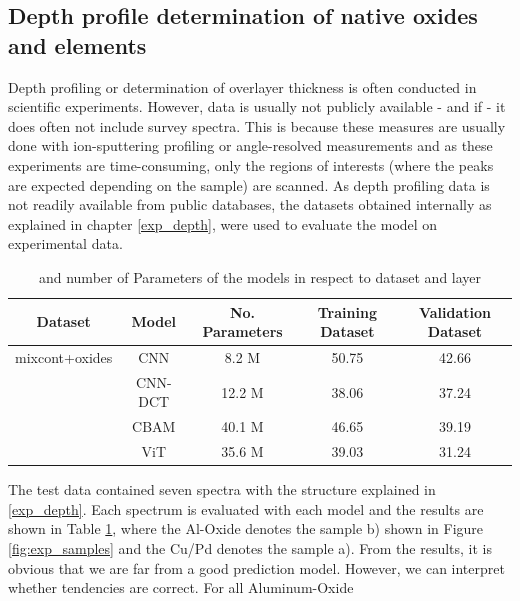 \subsection{Depth profile determination of native oxides and elements}

Depth profiling or determination of overlayer thickness is often conducted in scientific experiments. However, data is usually not publicly available - and if - it does often not include survey spectra. This is because these measures are usually done with ion-sputtering profiling or angle-resolved measurements and as these experiments are time-consuming, only the regions of interests (where the peaks are expected depending on the sample) are scanned.
As depth profiling data is not readily available from public databases, the datasets obtained internally as explained in chapter \ref{exp_depth}, were used to evaluate the model on experimental data.

\begin{table}[H]
    \centering
    \begin{tabular}{c|c|c|c|c}
        Dataset & Model   & No. Parameters & Training Dataset    & Validation Dataset    \\
        \hline
 mixcont+oxides& CNN     &   8.2 M       &      50.75      &          42.66         \\
               & CNN-DCT &   12.2 M       &     38.06           &      37.24           \\
               & CBAM    &   40.1 M       &    46.65             &      39.19            \\
               & ViT     &    35.6 M     &      39.03            &       31.24           \\

    \end{tabular}
    \caption{ and number of Parameters of the models in respect to dataset and layer}
    \label{tab:acc_depth}
\end{table}

The test data contained seven spectra with the structure explained in \ref{exp_depth}. Each spectrum is evaluated with each model and the results are shown in Table \ref{tab:acc_depth}, where the Al-Oxide denotes the sample b) shown in Figure \ref{fig:exp_samples} and the Cu/Pd denotes the sample a). From the results, it is obvious that we are far from a good prediction model. However, we can interpret whether tendencies are correct. For all Aluminum-Oxide 


